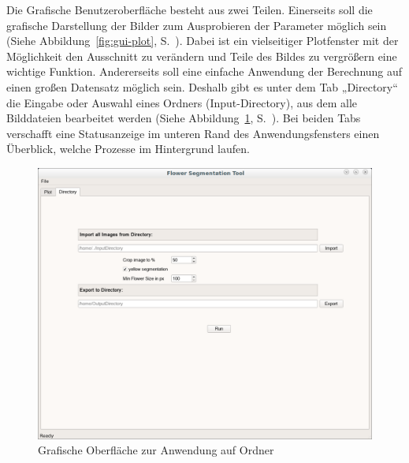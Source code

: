 Die Grafische Benutzeroberfläche besteht aus zwei Teilen. Einerseits soll die grafische Darstellung der Bilder zum Ausprobieren der Parameter möglich sein (Siehe Abbildung~\ref{fig:gui-plot}, S.~\pageref{fig:gui-plot}). Dabei ist ein vielseitiger Plotfenster mit der Möglichkeit den Ausschnitt zu verändern und Teile des Bildes zu vergrößern eine wichtige Funktion. Andererseits soll eine einfache Anwendung der Berechnung auf einen großen Datensatz möglich sein. Deshalb gibt es unter dem Tab „Directory“ die Eingabe oder Auswahl eines Ordners (Input-Directory), aus dem alle Bilddateien bearbeitet werden (Siehe Abbildung~\ref{fig:gui-dir}, S.~\pageref{fig:gui-dir}). Bei beiden Tabs verschafft eine Statusanzeige im unteren Rand des Anwendungsfensters einen Überblick, welche Prozesse im Hintergrund laufen.

\begin{figure}[htb]
 \centering
 \includegraphics[width=\textwidth,angle=0]{abb/gui/directory-fenster}
 \caption{Grafische Oberfläche zur Anwendung auf Ordner}
\label{fig:gui-dir}
\end{figure}


